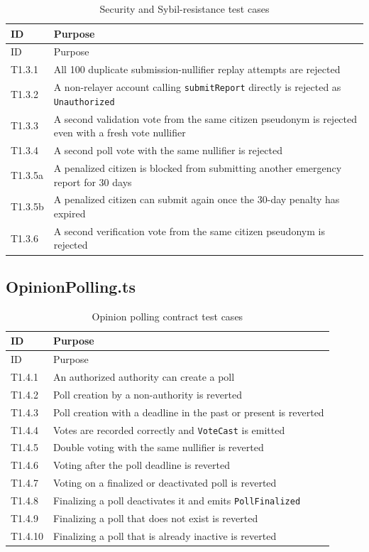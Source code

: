 \begin{longtable}{p{}|p{}}
\caption{Security and Sybil-resistance test cases} \\

  {ID} &   {Purpose} \\
\hline
\endfirsthead
\hline
  {ID} &   {Purpose} \\
\hline
\endhead
T1.3.1 & All 100 duplicate submission-nullifier replay attempts are rejected \\
\hline
T1.3.2 & A non-relayer account calling \texttt{submitReport} directly is rejected as \texttt{Unauthorized} \\
\hline
T1.3.3 & A second validation vote from the same citizen pseudonym is rejected even with a fresh vote nullifier \\
\hline
T1.3.4 & A second poll vote with the same nullifier is rejected \\
\hline
T1.3.5a & A penalized citizen is blocked from submitting another emergency report for 30 days \\
\hline
T1.3.5b & A penalized citizen can submit again once the 30-day penalty has expired \\
\hline
T1.3.6 & A second verification vote from the same citizen pseudonym is rejected \\

\end{longtable}

\subsection{OpinionPolling.ts}

\begin{longtable}{p{}|p{}}
\caption{Opinion polling contract test cases} \\

  {ID} &   {Purpose} \\
\hline
\endfirsthead
\hline
  {ID} &   {Purpose} \\
\hline
\endhead
 T1.4.1 & An authorized authority can create a poll \\
\hline
T1.4.2 & Poll creation by a non-authority is reverted \\
\hline
T1.4.3 & Poll creation with a deadline in the past or present is reverted \\
\hline
T1.4.4 & Votes are recorded correctly and \texttt{VoteCast} is emitted \\
\hline
T1.4.5 & Double voting with the same nullifier is reverted \\
\hline
T1.4.6 & Voting after the poll deadline is reverted \\
\hline
T1.4.7 & Voting on a finalized or deactivated poll is reverted \\
\hline
T1.4.8 & Finalizing a poll deactivates it and emits \texttt{PollFinalized} \\
\hline
T1.4.9 & Finalizing a poll that does not exist is reverted \\
\hline
T1.4.10 & Finalizing a poll that is already inactive is reverted \\

\end{longtable}


